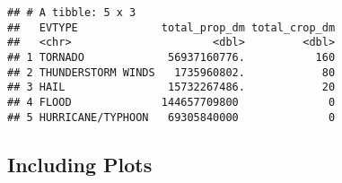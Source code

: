 \documentclass[
]{article}
\newenvironment{Shaded}{\begin{snugshade}}{\end{snugshade}}
\newcommand{\NormalTok}[1]{#1}
\begin{document}
\begin{Shaded}
\begin{Highlighting}[]
{{{{{\NormalTok{cost_of_economic}
\end{Highlighting}
\end{Shaded}

\begin{verbatim}
## # A tibble: 5 x 3
##   EVTYPE             total_prop_dm total_crop_dm
##   <chr>                      <dbl>         <dbl>
## 1 TORNADO             56937160776.           160
## 2 THUNDERSTORM WINDS   1735960802.            80
## 3 HAIL                15732267486.            20
## 4 FLOOD              144657709800              0
## 5 HURRICANE/TYPHOON   69305840000              0
\end{verbatim}

\hypertarget{including-plots}{%
\subsection{Including Plots}\label{including-plots}}
\end{document}
